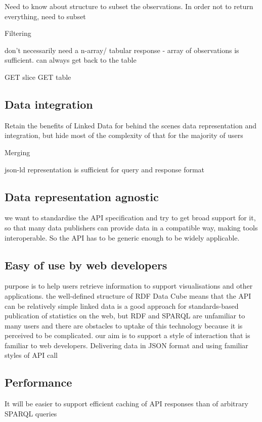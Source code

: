 \documentclass{llncs}
\begin{document}
Need to know about structure to subset the observations. In order not to return everything, need to subset

Filtering

don't necessarily need a n-array/ tabular response - array of observations is sufficient. can always get back to the table

GET slice
GET table


\subsection{Data integration}

Retain the benefits of Linked Data for behind the scenes data representation and integration, but hide most of the complexity of that for the majority of users

Merging 

json-ld representation is sufficient for query and response format

\subsection{Data representation agnostic}
we want to standardise the API specification and try to get broad support for it, so that many data publishers can provide data in a compatible way, making tools interoperable.  So the API has to be generic enough to be widely applicable.


\subsection{Easy of use by web developers}
purpose is to help users retrieve information to support visualisations and other applications.
the well-defined structure of RDF Data Cube means that the API can be relatively simple
linked data is a good approach for standards-based publication of statistics on the web, but RDF and SPARQL are unfamiliar to many users and there are obstacles to uptake of this technology because it is perceived to be complicated. our aim is to support a style of interaction that is familiar to web developers. Delivering data in JSON format and using familiar styles of API call 


\subsection{Performance}
It will be easier to support efficient caching of API responses than of arbitrary SPARQL queries
\end{document}
